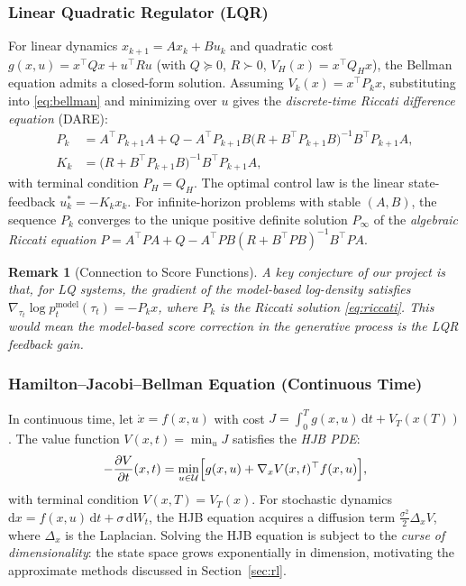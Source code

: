 \documentclass[letterpaper, 10pt, conference]{ieeeconf}
\newtheorem{remark}{Remark}
\newcommand{\dd}{\mathrm{d}}
\newcommand{\scoremodel}{\nabla_{\tau_t}\log p_t^{\mathrm{model}}(\tau_t)}
\begin{document}
\subsubsection{Linear Quadratic Regulator (LQR)}
For linear dynamics $x_{k+1} = Ax_k + Bu_k$ and quadratic cost
$g(x,u) = x^\top Q x + u^\top R u$ (with $Q \succeq 0$, $R \succ 0$,
$V_H(x) = x^\top Q_H x$), the Bellman equation admits a closed-form solution.
Assuming $V_k(x) = x^\top P_k x$, substituting into
\eqref{eq:bellman} and minimizing over $u$ gives the
\emph{discrete-time Riccati difference equation} (DARE):
\begin{align}
  P_k &= A^\top P_{k+1} A + Q
         - A^\top P_{k+1} B\bigl(R + B^\top P_{k+1} B\bigr)^{-1}
           B^\top P_{k+1} A,
  \label{eq:riccati}\\
  K_k &= \bigl(R + B^\top P_{k+1} B\bigr)^{-1}B^\top P_{k+1} A,
  \label{eq:gain}
\end{align}
with terminal condition $P_H = Q_H$.  The optimal control law is the linear
state-feedback $u_k^* = -K_k x_k$.  For infinite-horizon problems with stable
$(A,B)$, the sequence $P_k$ converges to the unique positive definite solution
$P_\infty$ of the \emph{algebraic Riccati equation}
$P = A^\top P A + Q - A^\top P B(R+B^\top P B)^{-1}B^\top P A$.

\begin{remark}[Connection to Score Functions]
  A key conjecture of our project is that, for LQ systems, the gradient of the
  model-based log-density satisfies
  $\scoremodel = -P_k x$,
  where $P_k$ is the Riccati solution \eqref{eq:riccati}.  This would mean the
  model-based score correction in the generative process \emph{is} the LQR
  feedback gain.
\end{remark}

\subsubsection{Hamilton--Jacobi--Bellman Equation (Continuous Time)}
In continuous time, let $\dot{x} = f(x,u)$ with cost
$J = \int_0^T g(x,u)\,\dd t + V_T(x(T))$.  The value function
$V(x,t) = \min_u J$ satisfies the \emph{HJB PDE}:
\begin{equation}
  -\frac{\partial V}{\partial t}(x,t)
  = \min_{u\in\mathcal{U}}\Bigl[g(x,u) + \nabla_x V(x,t)^\top f(x,u)\Bigr],
  \label{eq:hjb}
\end{equation}
with terminal condition $V(x,T) = V_T(x)$.  For stochastic dynamics
$\dd x = f(x,u)\,\dd t + \sigma\,\dd W_t$, the HJB equation acquires a
diffusion term $\frac{\sigma^2}{2}\Delta_x V$, where $\Delta_x$ is the
Laplacian.  Solving the HJB equation is subject to the \emph{curse of
dimensionality}: the state space grows exponentially in dimension, motivating
the approximate methods discussed in Section~\ref{sec:rl}.
\end{document}
